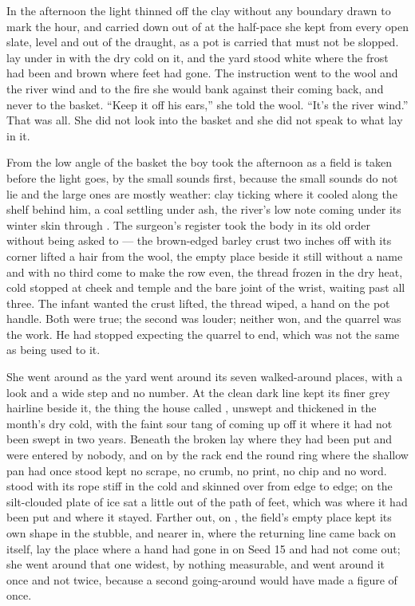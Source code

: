 \scenebreak

In the afternoon the light thinned off the clay without any boundary drawn to mark the hour, and  carried  down out of  at the half-pace she kept from every open slate, level and out of the draught, as a pot is carried that must not be slopped.  lay under  in  with the dry cold on it, and the yard stood white where the frost had been and brown where feet had gone. The instruction went to the wool and the river wind and to the fire she would bank against their coming back, and never to the basket. “Keep it off his ears,” she told the wool. “It's the river wind.” That was all. She did not look into the basket and she did not speak to what lay in it.

From the low angle of the basket the boy took the afternoon as a field is taken before the light goes, by the small sounds first, because the small sounds do not lie and the large ones are mostly weather: clay ticking where it cooled along the shelf behind him, a coal settling under ash, the river's low note coming under its winter skin through . The surgeon's register took the body in its old order without being asked to — the brown-edged barley crust two inches off with its corner lifted a hair from the wool, the empty place beside it still without a name and with no third come to make the row even, the thread frozen in the dry heat, cold stopped at cheek and temple and the bare joint of the wrist,  waiting past all three. The infant wanted the crust lifted, the thread wiped, a hand on the pot handle. Both were true; the second was louder; neither won, and the quarrel was the work. He had stopped expecting the quarrel to end, which was not the same as being used to it.

She went around  as the yard went around its seven walked-around places, with a look and a wide step and no number. At  the clean dark line kept its finer grey hairline beside it, the thing the house called , unswept and thickened in the month's dry cold, with the faint sour tang of  coming up off it where it had not been swept in two years. Beneath  the broken  lay where they had been put and were entered by nobody, and on  by the rack end the round ring where the shallow pan had once stood kept no scrape, no crumb, no print, no chip and no word.  stood with its rope stiff in the cold and  skinned over from edge to edge; on  the silt-clouded plate of ice sat a little out of the path of feet, which was where it had been put and where it stayed. Farther out, on , the field's empty place kept its own shape in the stubble, and nearer in, where the returning line came back on itself, lay the place where a hand had gone in on Seed 15 and had not come out; she went around that one widest, by nothing measurable, and went around it once and not twice, because a second going-around would have made a figure of once.

